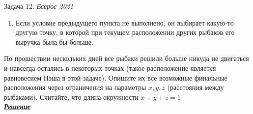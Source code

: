 \begin{mybox}{Задача 12. \textit{Всерос 2021}}
\begin{enumerate}
        размещения (с учетом фактического положения двух других), то на следующий день он остается в той же точке.
        \item Если условие предыдущего пункта не выполнено, он выбирает какую-то другую точку, в которой при текущем
        расположении других рыбаков его выручка была бы больше.
    \end{enumerate}
    \indent\setlength{\parindent}{1em}По прошествии нескольких дней все рыбаки решили больше никуда не двигаться и
    навсегда остались в некоторых точках (такое расположение является равновесием Нэша в этой задаче). Опишите их все
    возможные финальные расположения через ограничения на параметры $x,y,z$ (расстояния между рыбаками). Считайте, что
    длина окружности $x+y+z=1$\bigskip\\
    \textit{\textbf{\centering\href{https://iloveeconomics.ru/sites/default/files/olimp/vseros/2021/vseros_2021_solutions_10_21648.pdf}{Решение}}}
\end{mybox}

